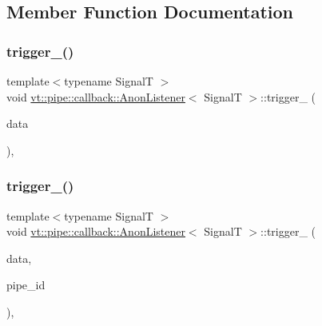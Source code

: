 \subsection{Member Function Documentation}
\mbox{\label{structvt_1_1pipe_1_1callback_1_1_anon_listener_ae96641b0c7f934d693018d91cfa7add4}} 
\subsubsection{\texorpdfstring{trigger\+\_\+()}{trigger\_()}\hspace{0.1cm}{\footnotesize\ttfamily [1/2]}}
{\footnotesize\ttfamily template$<$typename SignalT $>$ \\
void \hyperlink{structvt_1_1pipe_1_1callback_1_1_anon_listener}{vt\+::pipe\+::callback\+::\+Anon\+Listener}$<$ SignalT $>$\+::trigger\+\_\+ (\begin{DoxyParamCaption}\item[{\hyperlink{structvt_1_1pipe_1_1callback_1_1_anon_listener_a26182294e0b15bb16dd94040bb47ed73}{Signal\+Data\+Type} $\ast$}]{data }\end{DoxyParamCaption})\hspace{0.3cm}{\ttfamily [override]}, {\ttfamily [private]}}

\mbox{\label{structvt_1_1pipe_1_1callback_1_1_anon_listener_a8694018348ea69945fbc090bced5d4aa}} 
\subsubsection{\texorpdfstring{trigger\+\_\+()}{trigger\_()}\hspace{0.1cm}{\footnotesize\ttfamily [2/2]}}
{\footnotesize\ttfamily template$<$typename SignalT $>$ \\
void \hyperlink{structvt_1_1pipe_1_1callback_1_1_anon_listener}{vt\+::pipe\+::callback\+::\+Anon\+Listener}$<$ SignalT $>$\+::trigger\+\_\+ (\begin{DoxyParamCaption}\item[{\hyperlink{structvt_1_1pipe_1_1callback_1_1_anon_listener_a26182294e0b15bb16dd94040bb47ed73}{Signal\+Data\+Type} $\ast$}]{data,  }\item[{\hyperlink{namespacevt_ac9852acda74d1896f48f406cd72c7bd3}{Pipe\+Type} const \&}]{pipe\+\_\+id }\end{DoxyParamCaption})\hspace{0.3cm}{\ttfamily [override]}, {\ttfamily [private]}}



